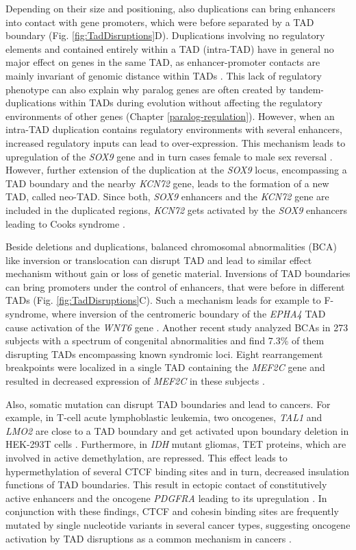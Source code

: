 \documentclass[a4paper,twoside=true,openright,parskip=full,chapterprefix=true,11pt,headings=normal,bibliography=totoc,listof=totoc,titlepage=on,captions=tableabove,draft=false]{scrreprt}
\theoremstyle{definition}
\theoremstyle{definition}
\theoremstyle{definition}
\theoremstyle{remark}
\begin{document}
Depending on their size and positioning, also duplications can bring
enhancers into contact with gene promoters, which were before separated
by a TAD boundary (Fig. \ref{fig:TadDisruptions}D). Duplications
involving no regulatory elements and contained entirely within a TAD
(intra-TAD) have in general no major effect on genes in the same TAD, as
enhancer-promoter contacts are mainly invariant of genomic distance
within TADs \citep{Symmons2016}. This lack of regulatory phenotype can
also explain why paralog genes are often created by tandem-duplications
within TADs during evolution without affecting the regulatory
environments of other genes (Chapter \ref{paralog-regulation}). However,
when an intra-TAD duplication contains regulatory environments with
several enhancers, increased regulatory inputs can lead to
over-expression. This mechanism leads to upregulation of the \emph{SOX9}
gene and in turn cases female to male sex reversal \citep{Franke2016}.
However, further extension of the duplication at the \emph{SOX9} locus,
encompassing a TAD boundary and the nearby \emph{KCN72} gene, leads to
the formation of a new TAD, called neo-TAD. Since both, \emph{SOX9}
enhancers and the \emph{KCN72} gene are included in the duplicated
regions, \emph{KCN72} gets activated by the \emph{SOX9} enhancers
leading to Cooks syndrome \citep{Franke2016}.

Beside deletions and duplications, balanced chromosomal abnormalities
(BCA) like inversion or translocation can disrupt TAD and lead to
similar effect mechanism without gain or loss of genetic material.
Inversions of TAD boundaries can bring promoters under the control of
enhancers, that were before in different TADs (Fig.
\ref{fig:TadDisruptions}C). Such a mechanism leads for example to
F-syndrome, where inversion of the centromeric boundary of the
\emph{EPHA4} TAD cause activation of the \emph{WNT6} gene
\citep{Lupianez2015}. Another recent study analyzed BCAs in 273 subjects
with a spectrum of congenital abnormalities and find 7.3\% of them
disrupting TADs encompassing known syndromic loci. Eight rearrangement
breakpoints were localized in a single TAD containing the \emph{MEF2C}
gene and resulted in decreased expression of \emph{MEF2C} in these
subjects \citep{Redin2017}.

Also, somatic mutation can disrupt TAD boundaries and lead to cancers.
For example, in T-cell acute lymphoblastic leukemia, two oncogenes,
\emph{TAL1} and \emph{LMO2} are close to a TAD boundary and get
activated upon boundary deletion in HEK-293T cells \citep{Hnisz2016}.
Furthermore, in \emph{IDH} mutant gliomas, TET proteins, which are
involved in active demethylation, are repressed. This effect leads to
hypermethylation of several CTCF binding sites and in turn, decreased
insulation functions of TAD boundaries. This result in ectopic contact
of constitutively active enhancers and the oncogene \emph{PDGFRA}
leading to its upregulation \citep{Flavahan2016}. In conjunction with
these findings, CTCF and cohesin binding sites are frequently mutated by
single nucleotide variants in several cancer types, suggesting oncogene
activation by TAD disruptions as a common mechanism in cancers
\citep{Katainen2015, Yu2017}.
\end{document}
